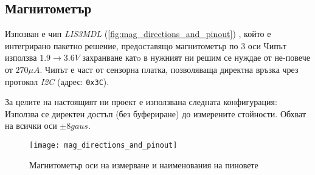 \subsection{Магнитометър}


Изпозван е чип \textit{LIS3MDL} (\autoref{fig:mag_directions_and_pinout}) \cite{magnetometerrefman},
който е интегрирано пакетно решение, 
предоставящо магнитометър по 3 оси 
Чипът използва \(1.9 \to 3.6V\) захранване катo в нужният ни решим се нуждае от не-повече от \(270\mu A\).
Чипът е част от сензорна платка, позволяваща директна връзка чрез протокол \textit{I2C} (адрес: \texttt{0x3C}).

За целите на настоящият ни проект е използвана следната конфигурация:
Използва се директен достъп (без буфериране) до измерените стойности.
Обхват на всички оси \(\pm 8gaus\).


\begin{figure}[htpb!]
    \centering
    \texttt{[image: mag\_directions\_and\_pinout]}
    \caption{Магнитометър оси на измерване и наименования на пиновете}
    \label{fig:mag_directions_and_pinout}
\end{figure}

\FloatBarrier
